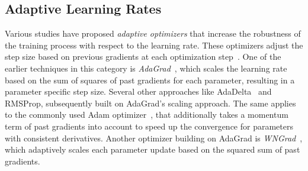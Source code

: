 \documentclass[runningheads]{llncs}
\begin{document}
\subsection{Adaptive Learning Rates}


Various studies have proposed \textit{adaptive optimizers} that increase the robustness of the training process with respect to the learning rate.
These optimizers adjust the step size based on previous gradients at each optimization step~\cite{duchiAdaptiveSubgradientMethods2011}.
One of the earlier techniques in this category is \textit{AdaGrad}~\cite{duchiAdaptiveSubgradientMethods2011}, which scales the learning rate based on the sum of squares of past gradients for each parameter, resulting in a parameter specific step size.
Several other approaches like AdaDelta~\cite{zeilerADADELTAAdaptiveLearning2012a} and RMSProp, subsequently built on AdaGrad's scaling approach.
The same applies to the commonly used Adam optimizer~\cite{kingmaAdamMethodStochastic2017b}, that additionally takes a momentum term of past gradients into account to speed up the convergence for parameters with consistent derivatives.
Another optimizer building on AdaGrad is \textit{WNGrad}~\cite{wuWNGradLearnLearning2020}, which adaptively scales each parameter update based on the squared sum of past gradients.
\end{document}
